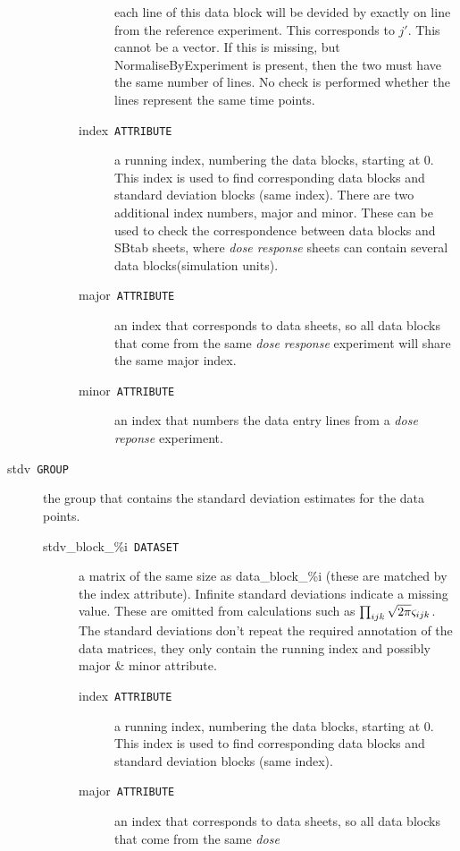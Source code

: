 \documentclass[utf8,english,DIV=12,12pt]{scrartcl}
\newcommand{\standard}[1]{\textsf{#1}}
\newcommand{\stdv}[1]{\ensuremath{\ifthenelse{\equal{#1}{g}}{\varsigma}{\sigma}}}
\begin{document}
\begin{description}
\begin{description}
\begin{description}
      each line of this data block will be devided by exactly on line
      from the reference experiment. This corresponds to $j'$. This
      cannot be a vector. If this is missing, but
      \textsf{NormaliseByExperiment} is present, then the two must
      have the same number of lines. No check is performed whether the
      lines represent the same time points.
    \item[index~\texttt{ATTRIBUTE}] a running index, numbering the
      data blocks, starting at $0$. This index is used to find
      corresponding data blocks and standard deviation blocks (same
      index). There are two additional index numbers, major and
      minor. These can be used to check the correspondence between
      data blocks and \standard{SBtab} sheets, where \emph{dose
        response} sheets can contain several data blocks(simulation
      units).
    \item[major~\texttt{ATTRIBUTE}] an index that corresponds to data
      sheets, so all data blocks that come from the same \emph{dose
        response} experiment will share the same major index.
    \item[minor~\texttt{ATTRIBUTE}] an index that numbers the data entry lines
      from a \emph{dose reponse} experiment.
    \end{description}
  \end{description}
\item[stdv~\texttt{GROUP}] the group that contains the standard deviation estimates for the data points.
  \begin{description}
  \item[stdv\_block\_\%i~\texttt{DATASET}] a matrix of the same
    size as \textsf{data\_block\_\%i} (these are matched by the
    \textsf{index} attribute). Infinite standard deviations indicate a
    missing value. These are omitted from calculations such as
    $\prod_{ijk} \sqrt{2\pi}\stdv{g}_{ijk}$. The standard deviations
    don't repeat the required annotation of the data matrices,
    they only contain the running index and possibly major \& minor
    attribute.
    \begin{description}
        \item[index~\texttt{ATTRIBUTE}] a running index, numbering the
      data blocks, starting at $0$. This index is used to find
      corresponding data blocks and standard deviation blocks (same
      index).
    \item[major~\texttt{ATTRIBUTE}] an index that corresponds to data
      sheets, so all data blocks that come from the same \emph{dose
}
\end{description}
\end{description}
\end{description}
\end{document}
